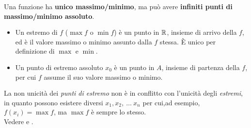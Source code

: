 \begin{observation}
	\label{obs:inf_pti_max_min_abs}
	Una funzione ha \textbf{unico massimo/minimo}, ma può avere \textbf{infiniti punti di massimo/minimo assoluto}.
	\begin{itemize}
		\item Un estremo di $f$ ($\max f$ o $\min f$) è un punto in $\mathbb{R}$, insieme di arrivo della $f$, ed è il valore massimo o minimo assunto dalla $f$ stessa. È unico per definizione di $\max$ e $\min$.
		\item Un punto di estremo assoluto $x_0$ è un punto in $A$, insieme di partenza della $f$, per cui $f$ assume il suo valore massimo o minimo.
	\end{itemize}
	La non unicità dei \textit{punti di estremo} non è in conflitto con l'unicità degli \textit{estremi}, in quanto possono esistere diversi $x_1, x_2,\:\dotsc\: x_n$ per cui,ad esempio, $f(x_i) = \max f$, ma $\max f$ è sempre lo stesso.\\
	Vedere  e .
\end{observation}
\newpage %
